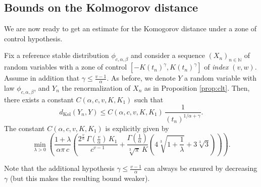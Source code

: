 \documentclass[envcountsame]{svmult}
\newcommand{\N}{\mathbb{N}}
\newcommand{\dkol}{d_\mathrm{Kol}}
\begin{document}
\subsection{Bounds on the Kolmogorov distance}
\label{sec:berry}
We are now ready to get an estimate for the Komogorov distance
under a zone of control hypothesis.

\begin{theorem}\label{thm:kolmogorov}
Fix a reference stable distribution $\phi_{c,\alpha,\beta}$
and consider a sequence $(X_n)_{n \in \N}$ of random variables
with a zone of control \hbox{$[-K(t_n)^\gamma,K(t_n)^\gamma]$} of \emph{index} $(v,w)$.
Assume in addition that $ \gamma \leq \tfrac{v-1}{\alpha}$.
As before, we denote $Y$ a random variable with law $\phi_{c,\alpha,\beta}$, and $Y_n$ the renormalization of $X_n$ as in Proposition \ref{prop:clt}.
Then, there exists a constant $C(\alpha,c,v,K,K_1)$ 
such that
$$\dkol(Y_n,Y) \leq C(\alpha,c,v,K,K_1)\,
\frac{1}{(t_n)^{1/\alpha+\gamma}}.$$
The constant $C(\alpha,c,v,K,K_1)$ is explicitly given by
\[\min_{\lambda>0} \left(\frac{1+\lambda}{\alpha \pi\,c}\left(\frac{2^\frac{v}{\alpha}\,\Gamma(\frac{v}{\alpha})\,K_1}{c^{v-1}} + \frac{\Gamma(\frac{1}{\alpha})}{\sqrt[3]{\pi}\,K }\left(4\sqrt[3]{1+\frac{1}{\lambda}}+3\sqrt[3]{3}\right)\right)\right).\]
\end{theorem}
\noindent 
Note that the additional hypothesis $ \gamma \leq \tfrac{v-1}{\alpha}$ can always be ensured by decreasing $\gamma$
(but this makes the resulting bound weaker).
 
\end{document}
